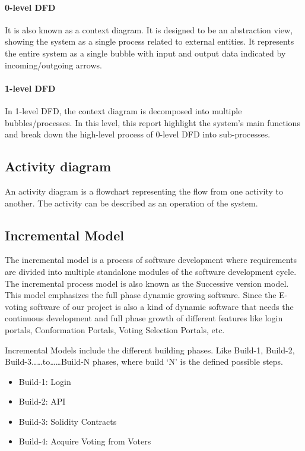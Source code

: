 \documentclass[a4paper,12pt]{report}
\begin{document}
\paragraph{0-level DFD}
It is also known as a context diagram. It is designed to be an abstraction view, showing the system as a single process related to external entities. It represents the entire system as a single bubble with input and output data indicated by incoming/outgoing arrows.

\paragraph{1-level DFD}
In 1-level DFD, the context diagram is decomposed into multiple bubbles/processes. In this level, this report highlight the system's main functions and break down the high-level process of 0-level DFD into sub-processes.

\subsection{Activity diagram}
An activity diagram is a flowchart representing the flow from one activity to another. The activity can be described as an operation of the system.

\subsection{Incremental Model}
The incremental model is a process of software development where requirements are divided into multiple standalone modules of the software development cycle. The incremental process model is also known as the Successive version model. This model emphasizes the full phase dynamic growing software. Since the E-voting software of our project is also a kind of dynamic software that needs the continuous development and full phase growth of different features like login portals, Conformation Portals, Voting Selection Portals, etc.

Incremental Models include the different building phases. Like Build-1, Build-2, Build-3……to……Build-N phases, where build ‘N’ is the defined possible steps.
\begin{itemize}
  \item Build-1: Login
  \item Build-2: API
  \item Build-3: Solidity Contracts
  \item Build-4: Acquire Voting from Voters
\end{itemize}
\end{document}
